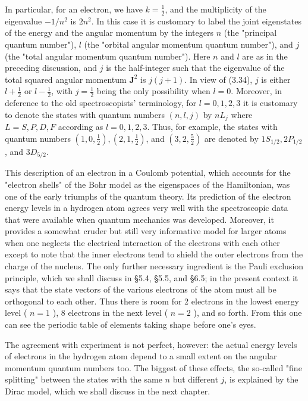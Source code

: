 \documentclass[10pt, letterpaper]{article}
\begin{document}
In particular, for an electron, we have $k=\frac{1}{2}$, and the multiplicity of the eigenvalue $-1 / n^{2}$ is $2 n^{2}$. In this case it is customary to label the joint eigenstates of the energy and the angular momentum by the integers $n$ (the "principal quantum number"), $l$ (the "orbital angular momentum quantum number"), and $j$ (the "total angular momentum quantum number"). Here $n$ and $l$ are as in the preceding discussion, and $j$ is the half-integer such that the eigenvalue of the total squared angular momentum $\mathbf{J}^{2}$ is $j(j+1)$. In view of (3.34), $j$ is either $l+\frac{1}{2}$ or $l-\frac{1}{2}$, with $j=\frac{1}{2}$ being the only possibility when $l=0$. Moreover, in deference to the old spectroscopists' terminology, for $l=0,1,2,3$ it is customary to denote the states with quantum numbers $(n, l, j)$ by $n L_{j}$ where $L=S, P, D, F$ according as $l=0,1,2,3$. Thus, for example, the states with quantum numbers $\left(1,0, \frac{1}{2}\right),\left(2,1, \frac{1}{2}\right)$, and $\left(3,2, \frac{5}{2}\right)$ are denoted by $1 S_{1 / 2}, 2 P_{1 / 2}$, and $3 D_{5 / 2}$.

This description of an electron in a Coulomb potential, which accounts for the "electron shells" of the Bohr model as the eigenspaces of the Hamiltonian, was one of the early triumphs of the quantum theory. Its prediction of the electron energy levels in a hydrogen atom agrees very well with the spectroscopic data that were available when quantum mechanics was developed. Moreover, it provides a somewhat cruder but still very informative model for larger atoms when one neglects the electrical interaction of the electrons with each other except to note that the inner electrons tend to shield the outer electrons from the charge of the nucleus. The only further necessary ingredient is the Pauli exclusion principle, which we shall discuss in §5.4, §5.5, and §6.5; in the present context it says that the state vectors of the various electrons of the atom must all be orthogonal to each other. Thus there is room for 2 electrons in the lowest energy level ( $n=1$ ), 8 electrons in the next level ( $n=2$ ), and so forth. From this one can see the periodic table of elements taking shape before one's eyes.

The agreement with experiment is not perfect, however: the actual energy levels of electrons in the hydrogen atom depend to a small extent on the angular momentum quantum numbers too. The biggest of these effects, the so-called "fine splitting" between the states with the same $n$ but different $j$, is explained by the Dirac model, which we shall discuss in the next chapter.
\end{document}
